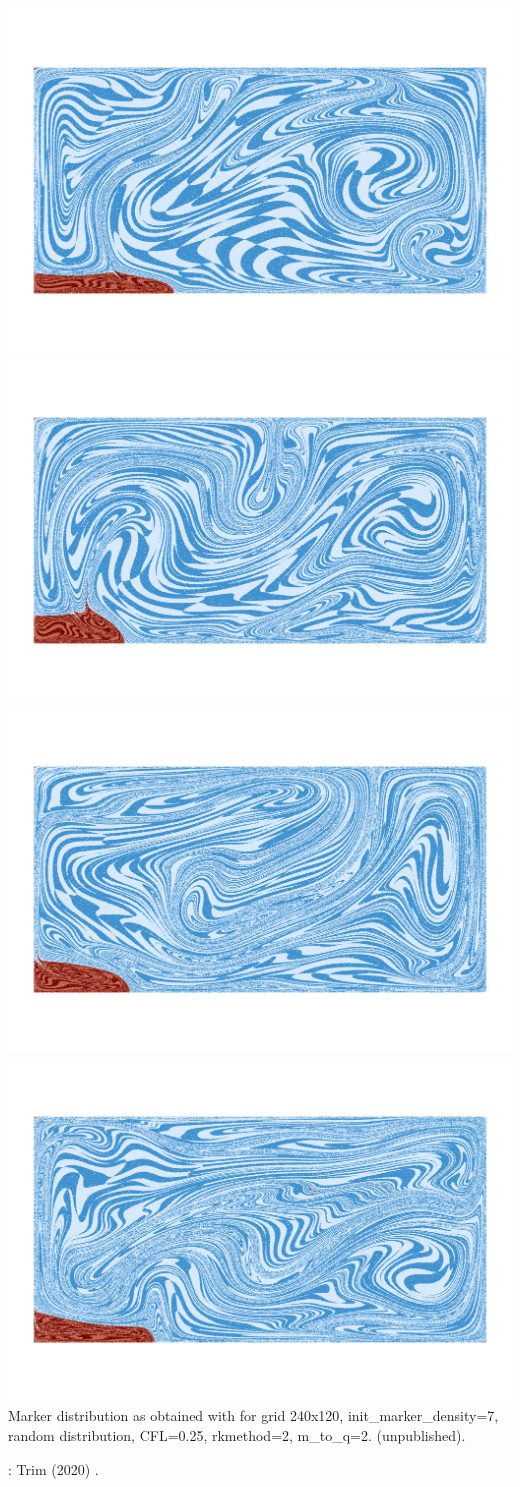 \begin{center}
\includegraphics[width=0.23\linewidth]{images/benchmark_thinlayer/maarkers0200}
\includegraphics[width=0.23\linewidth]{images/benchmark_thinlayer/maarkers0225}
\includegraphics[width=0.23\linewidth]{images/benchmark_thinlayer/maarkers0250}
\includegraphics[width=0.23\linewidth]{images/benchmark_thinlayer/maarkers0275}\\
{\captionfont Marker distribution as obtained with \elefant for 
grid 240x120, init\_marker\_density=7, \\
random distribution, 
CFL=0.25, rkmethod=2, m\_to\_q=2. (unpublished).}
\end{center}


\Literature: Trim \etal (2020) \cite{trlb20}.

